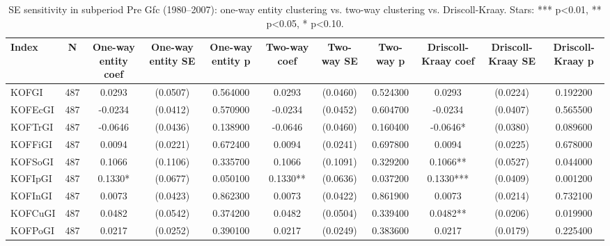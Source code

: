 \begin{table}[htbp]
\caption{SE sensitivity in subperiod Pre Gfc (1980--2007): one-way entity clustering vs. two-way clustering vs. Driscoll-Kraay. Stars: *** p<0.01, ** p<0.05, * p<0.10.}
\label{tab:se_comparison_pre_gfc}
\begin{tabular}{lcccccccccc}
\toprule
Index & N & One-way entity coef & One-way entity SE & One-way entity p & Two-way coef & Two-way SE & Two-way p & Driscoll-Kraay coef & Driscoll-Kraay SE & Driscoll-Kraay p \\
\midrule
KOFGI & 487 & 0.0293 & (0.0507) & 0.564000 & 0.0293 & (0.0460) & 0.524300 & 0.0293 & (0.0224) & 0.192200 \\
KOFEcGI & 487 & -0.0234 & (0.0412) & 0.570900 & -0.0234 & (0.0452) & 0.604700 & -0.0234 & (0.0407) & 0.565500 \\
KOFTrGI & 487 & -0.0646 & (0.0436) & 0.138900 & -0.0646 & (0.0460) & 0.160400 & -0.0646* & (0.0380) & 0.089600 \\
KOFFiGI & 487 & 0.0094 & (0.0221) & 0.672400 & 0.0094 & (0.0241) & 0.697800 & 0.0094 & (0.0225) & 0.678000 \\
KOFSoGI & 487 & 0.1066 & (0.1106) & 0.335700 & 0.1066 & (0.1091) & 0.329200 & 0.1066** & (0.0527) & 0.044000 \\
KOFIpGI & 487 & 0.1330* & (0.0677) & 0.050100 & 0.1330** & (0.0636) & 0.037200 & 0.1330*** & (0.0409) & 0.001200 \\
KOFInGI & 487 & 0.0073 & (0.0423) & 0.862300 & 0.0073 & (0.0422) & 0.861900 & 0.0073 & (0.0214) & 0.732100 \\
KOFCuGI & 487 & 0.0482 & (0.0542) & 0.374200 & 0.0482 & (0.0504) & 0.339400 & 0.0482** & (0.0206) & 0.019900 \\
KOFPoGI & 487 & 0.0217 & (0.0252) & 0.390100 & 0.0217 & (0.0249) & 0.383600 & 0.0217 & (0.0179) & 0.225400 \\
\bottomrule
\end{tabular}
\end{table}
